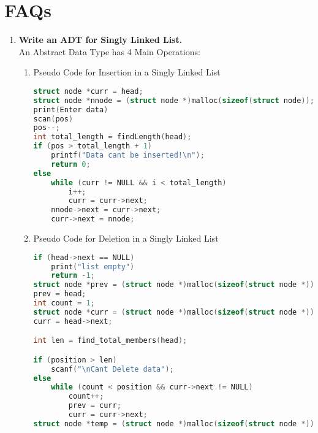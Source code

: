 \documentclass[11pt]{article}
\begin{document}
\section{FAQs}
\begin{enumerate}
	\item \textbf{Write an ADT for Singly Linked List.}\\
	      An Abstract Data Type has 4 Main Operations:
	      \begin{enumerate}
		      \item Pseudo Code for Insertion in a Singly Linked List
		            \begin{lstlisting}[language=C]
struct node *curr = head;
struct node *nnode = (struct node *)malloc(sizeof(struct node));
print(Enter data)
scan(pos)
pos--;
int total_length = findLength(head);
if (pos > total_length + 1)
	printf("Data cant be inserted!\n");
	return 0;
else
	while (curr != NULL && i < total_length)
		i++;
		curr = curr->next;
	nnode->next = curr->next;
	curr->next = nnode;
					\end{lstlisting}
								\item Pseudo Code for Deletion in a Singly Linked List
		            \begin{lstlisting}[language=C]
if (head->next == NULL)
	print("list empty")
	return -1;
struct node *prev = (struct node *)malloc(sizeof(struct node *));
prev = head;
int count = 1;
struct node *curr = (struct node *)malloc(sizeof(struct node *));
curr = head->next;

int len = find_total_members(head);

if (position > len)
	scanf("\nCant Delete data");
else
	while (count < position && curr->next != NULL)
		count++;
		prev = curr;
		curr = curr->next;
struct node *temp = (struct node *)malloc(sizeof(struct node *));


\end{lstlisting}
\end{enumerate}
\end{enumerate}
\end{document}
